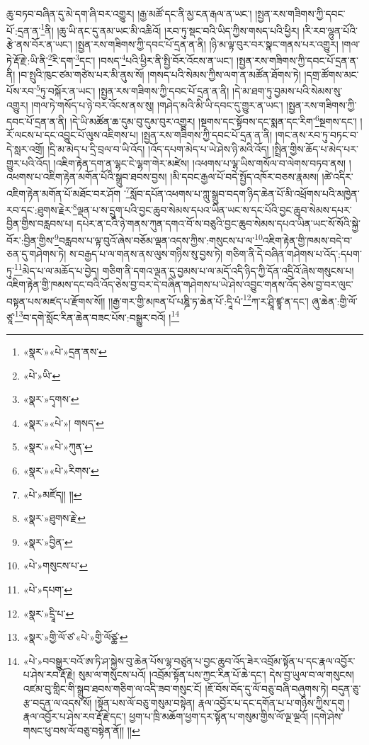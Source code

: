 ཆུ་བཏབ་བཞིན་དུ་མེ་དག་ཞི་བར་འགྱུར། །རྒྱ་མཚོ་དང་ནི་མྱ་ངན་རྒལ་ན་ཡང་། །སྤྱན་རས་གཟིགས་ཀྱི་དབང་པོ་:དྲན་ན་\footnote{«སྣར་»«པེ་»དྲན་ནས་}ནི། །ཆུ་ཡི་ནང་དུ་ནམ་ཡང་མི་འཆིའོ། །རབ་ཏུ་སྡང་བའི་ཡིད་ཀྱིས་གསད་པའི་ཕྱིར། །རི་རབ་ལྷུན་པོའི་རྩེ་ནས་བོར་ན་ཡང་། །སྤྱན་རས་གཟིགས་ཀྱི་དབང་པོ་དྲན་ན་ནི། །ཉི་མ་ལྟ་བུར་བར་སྣང་གནས་པར་འགྱུར། །གལ་ཏེ་རྡོ་རྗེ་:ཡི་ནི་\footnote{«པེ་»ཡི་}རི་དག་\footnote{«སྣར་»དྭགས་}དང་། །བསད་\footnote{«སྣར་»«པེ་»། གསད་}པའི་ཕྱིར་ནི་སྤྱི་བོར་འོངས་ན་ཡང་། །སྤྱན་རས་གཟིགས་ཀྱི་དབང་པོ་དྲན་ན་ནི། །བ་སྤུའི་ཁུང་ཙམ་གཙེས་པར་མི་ནུས་སོ། །གསད་པའི་སེམས་ཀྱིས་ལག་ན་མཚོན་ཐོགས་ཏེ། །དགྲ་ཚོགས་མང་པོས་རབ་\footnote{«སྣར་»«པེ་»ཀུན་}ཏུ་བསྐོར་ན་ཡང་། །སྤྱན་རས་གཟིགས་ཀྱི་དབང་པོ་དྲན་ན་ནི། །དེ་མ་ཐག་ཏུ་བྱམས་པའི་སེམས་སུ་འགྱུར། །གལ་ཏེ་གསོད་པ་ཉེ་བར་འོངས་ནས་སུ། །གཤེད་མའི་མི་ཡི་དབང་དུ་གྱུར་ན་ཡང་། །སྤྱན་རས་གཟིགས་ཀྱི་དབང་པོ་དྲན་ན་ནི། །དེ་ཡི་མཚོན་ཆ་དུམ་བུ་དུམ་བུར་འགྱུར། །སྔགས་དང་སྟོབས་དང་སྨན་དང་རིག་\footnote{«སྣར་»«པེ་»རིགས་}སྔགས་དང་། །རོ་ལངས་པ་དང་འབྱུང་པོ་ལུས་འཇིགས་པ། །སྤྱན་རས་གཟིགས་ཀྱི་དབང་པོ་དྲན་ན་ནི། །གང་ནས་རབ་ཏུ་བཏང་བ་དེ་སླར་འགྲོ། །དྲི་མ་མེད་པ་དྲི་བྲལ་བ་ཡི་འོད། །འོད་དཔག་མེད་པ་ཡེ་ཤེས་ཉི་མའི་འོད། །སྤྲིན་གྱིས་ཆོད་པ་མེད་པར་གྱུར་པའི་འོད། །འཇིག་རྟེན་དག་ན་ལྷང་ངེ་ལྷག་གེར་མཛེས། །འཕགས་པ་ལྷ་ཡིས་གསོལ་བ་ལེགས་བཏབ་ནས། །འཕགས་པ་འཇིག་རྟེན་མགོན་པོའི་སྒྲུབ་ཐབས་བྱས། །མི་དབང་རྒྱལ་པོ་བདེ་སྤྱོད་འཁོར་བཅས་རྣམས། །ཚེ་འདིར་འཇིག་རྟེན་མགོན་པོ་མཐོང་བར་ཤོག ་\footnote{«པེ་»མཛོད།། །།}སློབ་དཔོན་འཕགས་པ་ཀླུ་སྒྲུབ་བདག་ཉིད་ཆེན་པོ་མི་འཕྲོགས་པའི་མཁྱེན་རབ་དང་:ཐུགས་རྗེར་\footnote{«སྣར་»ཐུགས་རྗེ་}ལྡན་པ་ས་དྲུག་པའི་བྱང་ཆུབ་སེམས་དཔའ་ཡིན་ཡང་ས་དང་པོའི་བྱང་ཆུབ་སེམས་དཔར་བྱིན་གྱིས་བརླབས་པ། དཔེར་ན་ངའི་ཉེ་གནས་ཀུན་དགའ་བོ་ས་བཅུའི་བྱང་ཆུབ་སེམས་དཔའ་ཡིན་ཡང་སོ་སོའི་སྐྱེ་བོར་:བྱིན་གྱིས་\footnote{«སྣར་»བྱིན་}བརླབས་པ་ལྟ་བུའོ་ཞེས་བཅོམ་ལྡན་འདས་ཀྱིས་:གསུངས་པ་ལ་\footnote{«པེ་»གསུངས་པ་}འཇིག་རྟེན་གྱི་ཁམས་བདེ་བ་ཅན་དུ་གཤེགས་ཏེ། ས་བརྒྱད་པ་ལ་གནས་ནས་ལུས་གཉིས་སུ་བྱས་ཏེ། གཅིག་ནི་དེ་བཞིན་གཤེགས་པ་འོད་:དཔག་ཏུ་\footnote{«པེ་»དཔག་}མེད་པ་ལ་མཆོད་པ་བྱེད། གཅིག་ནི་དགའ་ལྡན་དུ་བྱམས་པ་ལ་མདོ་འདི་ཉིད་ཀྱི་དོན་འདྲིའོ་ཞེས་གསུངས་པ། འཇིག་རྟེན་གྱི་ཁམས་དང་བའི་འོད་ཅེས་བྱ་བར་དེ་བཞིན་གཤེགས་པ་ཡེ་ཤེས་འབྱུང་གནས་འོད་ཅེས་བྱ་བར་ལུང་བསྟན་པས་མཛད་པ་རྫོགས་སོ།། །།རྒྱ་གར་གྱི་མཁན་པོ་པཎྜི་ཏ་ཆེན་པོ་:དཱི་པཾ་\footnote{«སྣར་»དྲཱི་པ་}ཀ་ར་ཤྲཱི་ཛྙཱ་ན་དང་། ཞུ་ཆེན་:གྱི་ལོ་ཙཱ་\footnote{«སྣར་»གྱི་ལོ་ཙ་«པེ་»གྱི་ལོཙྪ་}བ་དགེ་སློང་རིན་ཆེན་བཟང་པོས་:བསྒྱུར་བའོ། །\footnote{«པེ་»བབསྒྱུར་བའོ་ཨ་ཏི་ཤ་སྐྱེས་བུ་ཆེན་པོས་ལྷ་བཙུན་པ་བྱང་ཆུབ་འོད་ཟེར་འབྲོམ་སྟོན་པ་དང་རྣལ་འབྱོར་པ་ཤེས་རབ་རྡོ་རྗེ། སུམ་ལ་གསུངས་པའོ། །འབྲོམ་སྟོན་པས་ཀྱང་རིན་པོ་ཆེ་དང་། དེས་བྱ་ཡུལ་བ་ལ་གསུངས། འཛམ་བུ་གླིང་གི་སྒྲུབ་ཐབས་གཅིག་ལ་འདི་ཟབ་གསུང་ངོ། །ཇོ་བོས་བོད་དུ་ལོ་བཅུ་བཞི་བཞུགས་ཏེ། བདུན་ཅུ་རྩ་བདུན་ལ་འདས་སོ། །སྟོན་པས་ལོ་བཅུ་གསུམ་བསྟེན། རྣལ་འབྱོར་པ་དང་དགོན་པ་པ་གཉིས་ཀྱིས་དགུ །རྣལ་འབྱོར་པ་ཤེས་རབ་རྡོ་རྗེ་དང་། ཕྱག་པ་ཁྲི་མཆོག་ཕྱག་དར་སྟོན་པ་གསུམ་གྱིས་ལོ་ལྔ་ལྔའོ། །དགེ་ཤེས་གསང་ཕུ་བས་ལོ་བཅུ་བསྟེན་ནོ།། །།}